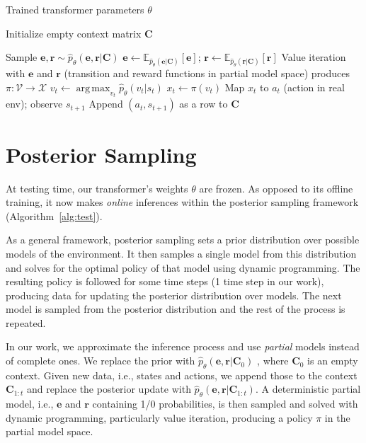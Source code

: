 \documentclass[sigconf]{aamas}
\DeclareMathOperator*{\argmax}{arg\,max}
\begin{document}
\begin{algorithm}[t]
  \caption{Posterior Sampling}
  \label{alg:test}
  \begin{algorithmic}
    \REQUIRE Trained transformer parameters $\theta$

    \STATE Initialize empty context matrix $\mathbf{C}$
    
    \STATE Sample $\mathbf{e}, \mathbf{r} \sim \hat{p}_\theta(\mathbf{e}, \mathbf{r}|\mathbf{C})$
    \STATE $\mathbf{e} \gets \mathbb{E}_{\hat{p}_\theta(\mathbf{e}|\mathbf{C})}[\mathbf{e}]$; $\mathbf{r} \gets \mathbb{E}_{\hat{p}_\theta( \mathbf{r}|\mathbf{C})}[\mathbf{r}]$
    \ENDIF
    \STATE Value iteration with $\mathbf{e}$ and $\mathbf{r}$ (transition and reward functions in partial model space) produces $\pi : \mathscr{V} \rightarrow \mathscr{X}$
    \STATE $v_t \gets \argmax_{v_t} \hat{p}_\theta(v_t|s_t)$
    \STATE $x_t \gets \pi(v_t)$
    \STATE Map $x_t$ to $a_t$ (action in real env); observe $s_{t+1}$
    \STATE Append $(a_t, s_{t+1})$ as a row to $\mathbf{C}$
    \ENDFOR
  \end{algorithmic}
\end{algorithm}

\section{Posterior Sampling}
\label{sec:post-sampl-plann}

At testing time, our transformer's weights $\theta$ are frozen. As opposed to its offline training, it now makes \textit{online} inferences within the posterior sampling framework (Algorithm~\ref{alg:test}).

As a general framework, posterior sampling sets a prior distribution over possible models of the environment. It then samples a single model from this distribution and solves for the optimal policy of that model using dynamic programming. The resulting policy is followed for some time steps (1 time step in our work), producing data for updating the posterior distribution over models. The next model is sampled from the posterior distribution and the rest of the process is repeated.

In our work, we approximate the inference process and use \textit{partial} models instead of complete ones. We replace the prior with
$\hat{p}_\theta(\mathbf{e}, \mathbf{r}|\mathbf{C}_0)$
, where $\mathbf{C}_{0}$ is an empty context. Given new data, i.e., states and actions, we append those to the context $\mathbf{C}_{1:t}$ and replace the posterior update with $\hat{p}_\theta(\mathbf{e}, \mathbf{r}|\mathbf{C}_{1:t})$. A deterministic partial model, i.e., $\mathbf{e}$ and $\mathbf{r}$ containing 1/0 probabilities, is then sampled and solved with dynamic programming, particularly value iteration, producing a policy $\pi$ in the partial model space.
\end{document}
